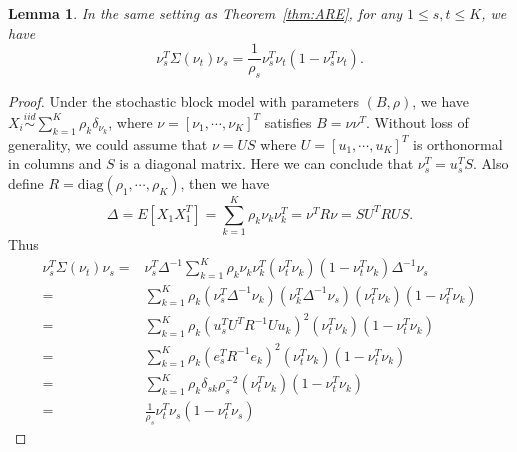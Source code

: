 \documentclass[10pt,letterpaper]{article}
\newtheorem{lemma}[fact]{Lemma}
\begin{document}
\begin{lemma}
\label{lm:mseForm}
In the same setting as Theorem~\ref{thm:ARE}, for any $1 \le s, t \le K$, we have
\[
	\nu_s^T \Sigma(\nu_t) \nu_s = \frac{1}{\rho_s} \nu_s^T \nu_t (1- \nu_s^T \nu_t).
\]
\end{lemma}
\begin{proof}
Under the stochastic block model with parameters $(B, \rho)$, we have $X_i \stackrel{iid}{\sim} \sum_{k=1}^K \rho_k \delta_{\nu_k}$, where $\nu = [\nu_1, \cdots, \nu_K]^T$ satisfies $B = \nu \nu^T$. Without loss of generality, we could assume that $\nu = U S$ where $U = [u_1, \cdots, u_K]^T$ is orthonormal in columns and $S$ is a diagonal matrix. Here we can conclude that $\nu_s^T = u_s^T S$. Also define $R = \text{diag}(\rho_1, \cdots, \rho_K)$, then we have
\[
	\Delta = E[X_1 X_1^T] = \sum_{k=1}^K \rho_k \nu_k \nu_k^T = \nu^T R \nu = S U^T R U S.
\]
Thus
\begin{align*}
	\nu_s^T \Sigma(\nu_t) \nu_s = &
    \nu_s^T \Delta^{-1} \sum_{k=1}^K \rho_k \nu_k \nu_k^T (\nu_t^T \nu_k)(1 - \nu_t^T \nu_k) \Delta^{-1} \nu_s \\
    = & \sum_{k=1}^K \rho_k (\nu_s^T \Delta^{-1} \nu_k) (\nu_k^T \Delta^{-1} \nu_s) (\nu_t^T \nu_k) (1 - \nu_t^T \nu_k) \\
    = & \sum_{k=1}^K \rho_k (u_s^T U^T R^{-1} U u_k)^2 (\nu_t^T \nu_k) (1 - \nu_t^T \nu_k) \\
    = & \sum_{k=1}^K \rho_k (e_s^T R^{-1} e_k)^2 (\nu_t^T \nu_k) (1 - \nu_t^T \nu_k) \\
    = & \sum_{k=1}^K \rho_k \delta_{sk} \rho_s^{-2} (\nu_t^T \nu_k) (1 - \nu_t^T \nu_k) \\
    = & \frac{1}{\rho_s} \nu_t^T \nu_s (1 - \nu_t^T \nu_s)
\end{align*}
\end{proof}

\end{document}
